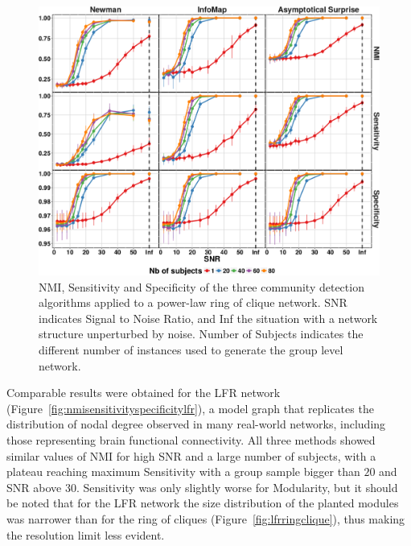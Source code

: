\begin{figure}[htb!]
\includegraphics[width=\textwidth]{images/pacopaperfigure4.pdf}
\caption{NMI, Sensitivity and Specificity of the three community detection algorithms applied to a power-law ring of clique network. SNR indicates Signal to Noise Ratio, and Inf the situation with a network structure unperturbed by noise. Number of Subjects indicates the different number of instances used to generate the group level network.}
\label{fig:nmisensitivityspecificityringclique}
\end{figure}

Comparable results were obtained for the LFR network (Figure~\ref{fig:nmisensitivityspecificitylfr}), a model graph that replicates the distribution of nodal degree observed in many real-world networks, including those representing brain functional connectivity.
All three methods showed similar values of NMI for high SNR and a large number of subjects, with a plateau reaching maximum Sensitivity with a group sample bigger than $20$ and SNR above $30$.
Sensitivity was only slightly worse for Modularity, but it should be noted that for the LFR network the size distribution of the planted modules was narrower than for the ring of cliques (Figure~\ref{fig:lfrringclique}), thus making the resolution limit less evident.

